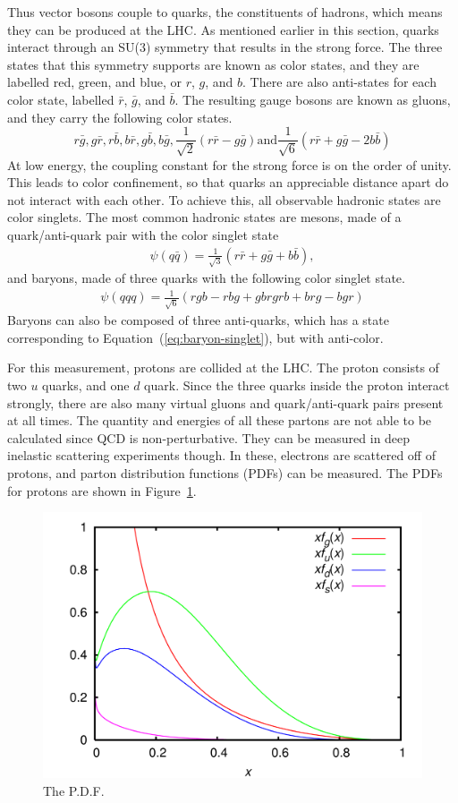 Thus vector bosons couple to quarks, the constituents of hadrons,
which means they can be produced at the LHC.
As mentioned earlier in this section,
quarks interact through an SU(3) symmetry that results in the strong force.
The three states that this symmetry supports are known as color states,
and they are labelled red, green, and blue, or $r$, $g$, and $b$.
There are also anti-states for each color state,
labelled $\bar{r}$, $\bar{g}$, and $\bar{b}$.
The resulting gauge bosons are known as gluons, and they carry the following color states.
\[
r\bar{g}, g\bar{r}, r\bar{b}, b\bar{r}, g\bar{b}, b\bar{g}, \frac{1}{\sqrt{2}}(r\bar{r} - g\bar{g}) \mathrm{and} \frac{1}{\sqrt{6}}(r\bar{r} + g\bar{g} - 2b\bar{b})
\]
At low energy, the coupling constant for the strong force is on the order of unity.
This leads to color confinement,
so that quarks an appreciable distance apart do not interact with each other.
To achieve this, all observable hadronic states are color singlets.
The most common hadronic states are mesons, made of a quark/anti-quark pair
with the color singlet state
\begin{gather}
  \psi(q\bar{q}) = \frac1{\sqrt{3}} (r\bar{r} + g\bar{g} + b\bar{b}),
\end{gather}
and baryons, made of three quarks with the following color singlet state.
\begin{gather}
  \psi(qqq) = \frac{1}{\sqrt{6}}(rgb - rbg + gbr  grb + brg - bgr) \label{eq:baryon-singlet}
\end{gather}
Baryons can also be composed of three anti-quarks,
which has a state corresponding to Equation~(\ref{eq:baryon-singlet}),
but with anti-color.

For this measurement, protons are collided at the LHC.
The proton consists of two $u$ quarks, and one $d$ quark.
Since the three quarks inside the proton interact strongly,
there are also many virtual gluons and quark/anti-quark pairs present at all times.
The quantity and energies of all these partons are not able to be calculated
since QCD is non-perturbative.
They can be measured in deep inelastic scattering experiments though.
In these, electrons are scattered off of protons,
and parton distribution functions (PDFs) can be measured.
The PDFs for protons are shown in Figure~\ref{fig:pdf}.
\begin{figure}
  \centering
  \includegraphics[width=0.7\linewidth]{figures/CTEQ6_parton_distribution_functions.png}
  \caption{The P.D.F.}
  \label{fig:pdf}
\end{figure}

